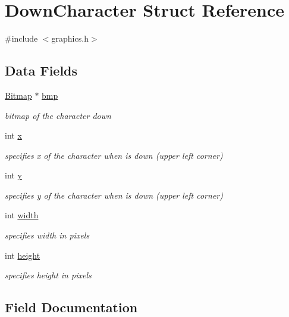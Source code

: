 \hypertarget{struct_down_character}{}\section{Down\+Character Struct Reference}
\label{struct_down_character}


{\ttfamily \#include $<$graphics.\+h$>$}

\subsection*{Data Fields}
\begin{DoxyCompactItemize}
\item 
\hyperlink{struct_bitmap}{Bitmap} $\ast$ \hyperlink{struct_down_character_ada429bf89af3356a338f9532d68623cc}{bmp}
\begin{DoxyCompactList}\small\item\em bitmap of the character down \end{DoxyCompactList}\item 
int \hyperlink{struct_down_character_a6150e0515f7202e2fb518f7206ed97dc}{x}
\begin{DoxyCompactList}\small\item\em specifies x of the character when is down (upper left corner) \end{DoxyCompactList}\item 
int \hyperlink{struct_down_character_a0a2f84ed7838f07779ae24c5a9086d33}{y}
\begin{DoxyCompactList}\small\item\em specifies y of the character when is down (upper left corner) \end{DoxyCompactList}\item 
int \hyperlink{struct_down_character_a2474a5474cbff19523a51eb1de01cda4}{width}
\begin{DoxyCompactList}\small\item\em specifies width in pixels \end{DoxyCompactList}\item 
int \hyperlink{struct_down_character_ad12fc34ce789bce6c8a05d8a17138534}{height}
\begin{DoxyCompactList}\small\item\em specifies height in pixels \end{DoxyCompactList}\end{DoxyCompactItemize}


\subsection{Field Documentation}
\mbox{\label{struct_down_character_ada429bf89af3356a338f9532d68623cc}} 
